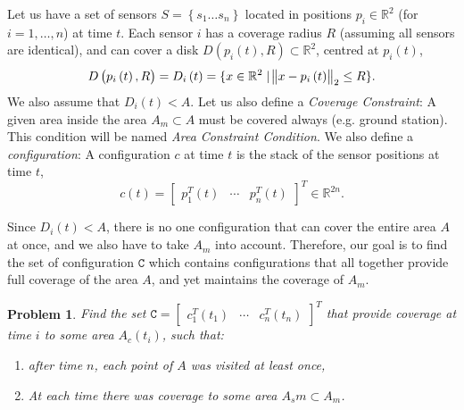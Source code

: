 \documentclass{iacas}
\newcommand{\rsqr}{\mathbb{R}^2}
\newcommand{\bmat}[1]{\begin{bmatrix}#1\end{bmatrix}}
\newtheorem{problem}{Problem}
\begin{document}
Let us have a set of sensors $S = \left\{s_1 \ldots s_n\right\}$ located in positions $p_i \in \mathbb{R}^2$ (for $i=1,\ldots,n$) at time $t$. Each sensor $i$ has a coverage radius $R$ (assuming all sensors are identical), and can cover a disk $D\left(p_{i}\left(t\right), R\right)\subset \rsqr$, centred at $p_{i}\left(t\right)$, 
\begin{equation}
D\left(p_{i}\left(t\right),R\right) = D_{i}\left(t\right) = \{x\in\rsqr \mid\norm{x - p_{i}\left(t\right)}_{2} \leq R\}.
\end{equation}
We also assume that $D_{i}\left( t \right) < A$. Let us also define a \emph{Coverage Constraint}: A given area inside the area $A_{m} \subset A$ must be covered always (e.g. ground station). This condition will be named \emph{Area Constraint Condition}.
We also define a \emph{configuration}: A configuration $c$ at time $t$ is the stack of the sensor positions at time $t$,
\begin{equation}
c\left(t\right) = \bmat{
p_{1}^{T}\left(t\right)&\cdots&p_{n}^{T}\left(t\right)}^{T}\in\mathbb{R}^{2n}.
\end{equation}

Since $D_{i}\left( t \right) < A$, there is no one configuration that can cover the entire area $A$ at once, and we also have to take $A_m$ into account. Therefore, our goal is to find the set of configuration $\texttt{C}$ which contains configurations that all together provide full coverage of the area $A$, and yet maintains the coverage of $A_m$.

\begin{problem} \label{GeneralProblem}
Find the set $\texttt{C} = \bmat{
c_{1}^{T}\left(t_1\right)&\cdots&c_{n}^{T}\left(t_n\right)}^{T}$ that provide coverage at time $i$ to some area $A_c \left( t_i \right)$, such that:
\begin{enumerate}
\item after time $n$, each point of $A$ was visited at least once,
\item At each time there was coverage to some area $A_sm \subset A_m$.
\end{enumerate}
\end{problem}

\end{document}
